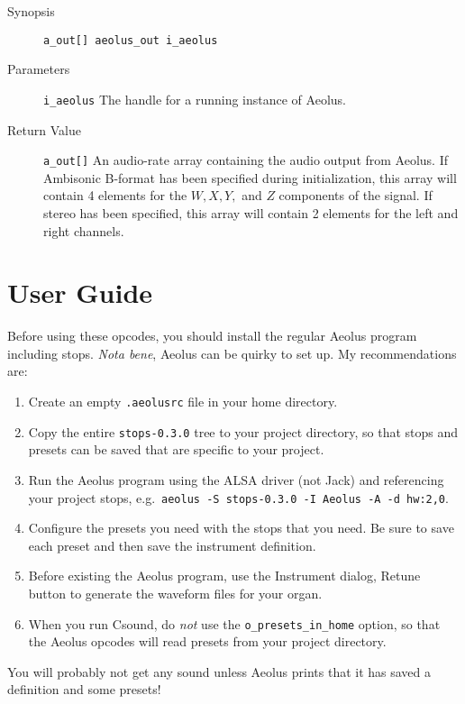 \documentclass[english,11pt,letterpaper,onecolumn]{scrartcl}
\begin{document}
{\begin{description}
	\item[Synopsis]
	\item[]\lstinline|a_out[] aeolus_out i_aeolus|
	\item[Parameters]
	\item[]\lstinline|i_aeolus| The handle for a running instance of Aeolus.
	\item[Return Value]
	\item[]\lstinline|a_out[]| An audio-rate array containing the audio output from Aeolus. If Ambisonic B-format has been specified during initialization, this array will contain 4 elements for the $W, X, Y,$ and $Z$ components of the signal. If stereo has been specified, this array will contain 2 elements for the left and right channels.
\end{description}

\section{User Guide}

Before using these opcodes, you should install the regular Aeolus program including stops. \emph{Nota bene}, Aeolus can be quirky to set up. My recommendations are:
\begin{enumerate}
	\item Create an empty \lstinline|.aeolusrc| file in your home directory.
	\item Copy the entire \lstinline|stops-0.3.0| tree to your project directory, so that stops and presets can be saved that are specific to your project.
	\item Run the Aeolus program using the ALSA driver (not Jack) and referencing your project stops, e.g.\ \lstinline|aeolus -S stops-0.3.0 -I Aeolus -A -d hw:2,0|.
	\item Configure the presets you need with the stops that you need. Be sure to save each preset and then save the instrument definition.
	\item Before existing the Aeolus program, use the Instrument dialog, Retune button to generate the waveform files for your organ.
	\item When you run Csound, do \emph{not} use the \lstinline|o_presets_in_home| option, so that the Aeolus opcodes will read presets from your project directory.
\end{enumerate}

You will probably not get any sound unless Aeolus prints that it has saved a
definition and some presets!

}
\end{document}
